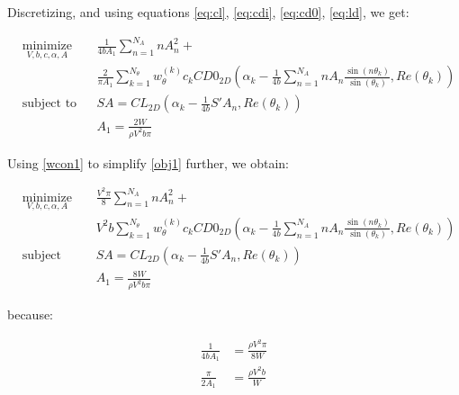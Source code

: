 \documentclass[letterpaper,12pt]{article}
\begin{document}
Discretizing, and using equations \ref{eq:cl}, \ref{eq:cdi}, \ref{eq:cd0}, \ref{eq:ld}, we get:


\begin{align}
	& \underset{V, b, c, \alpha, A}{\text{minimize}}
	& & \frac {1}{4bA_1} \sum_{n=1}^{N_A} n A_{n}^2 + \nonumber \\
	&&& \frac 2 {\pi A_1} \sum_{k=1}^{N_{\theta}} w_{\theta}^{(k)} c_k CD0_{2D}\left( 
		\alpha_k - 
		\frac {1}{4b} \sum_{n=1}^{N_A} n A_n \frac{ \sin(n\theta_k) }{\sin(\theta_k)} , Re(\theta_k)
		\right) \label{obj1} \\
	& \text{subject to}
	& & SA =  CL_{2D} \left( \alpha_k - \frac {1}{4b} S' A_n , Re(\theta_k)\right)  \label{llcon1}\\
	& &  & A_1 = \frac{2W}{\rho V^2 b \pi} \label{wcon1}
\end{align}

Using \ref{wcon1} to simplify \ref{obj1} further, we obtain:

\begin{align}
	& \underset{V, b, c, \alpha, A}{\text{minimize}}
	& & \frac{V^2 \pi}{8}\sum_{n=1}^{N_A} n A_{n}^2 + \nonumber \\
	&&&  V^2 b  \sum_{k=1}^{N_{\theta}} w_{\theta}^{(k)} c_k CD0_{2D}\left( 
		\alpha_k - 
		\frac {1}{4b} \sum_{n=1}^{N_A} n A_n \frac{ \sin(n\theta_k) }{\sin(\theta_k)} , Re(\theta_k)
		\right) \label{obj2} \\
	& \text{subject to}
	& & SA =  CL_{2D} \left( \alpha_k - \frac {1}{4b} S' A_n , Re(\theta_k)\right)  \label{llcon2}\\
	& &  & A_1 = \frac{8W}{\rho V^2 b \pi} \label{wcon2}
\end{align}

because:

\begin{align*}
	\frac{1}{4bA_1} &= \frac{\rho V^2 \pi}{8W} \\
	\frac{\pi}{2A_1} &= \frac{\rho V^2 b}{ W} 
\end{align*}

\end{document}
